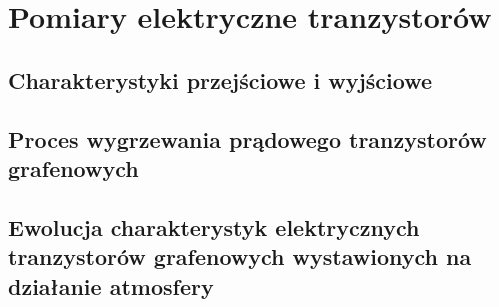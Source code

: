 \chapter{Pomiary elektryczne tranzystorów}
	\section{Charakterystyki przejściowe i wyjściowe}
	\section{Proces wygrzewania prądowego tranzystorów grafenowych}
	\section{Ewolucja charakterystyk elektrycznych tranzystorów grafenowych wystawionych na działanie atmosfery}
